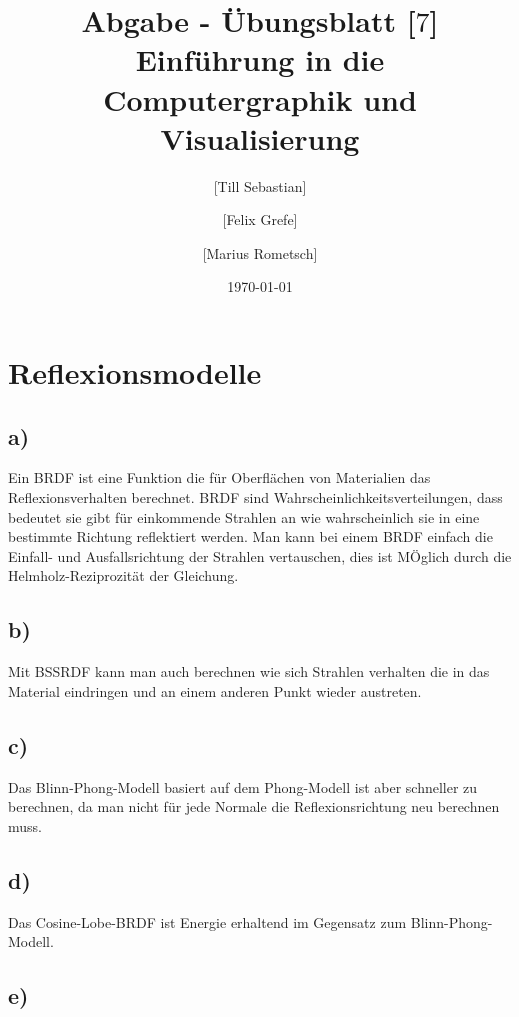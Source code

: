 \documentclass[10pt,a4paper]{article}
\begin{document}
\title{Abgabe - Übungsblatt [$7$]\\
\small{Einführung in die Computergraphik und Visualisierung}}
\author{ [Till Sebastian] \and [Felix Grefe] \and [Marius Rometsch]}
\date{\today}
\maketitle



\section*{Reflexionsmodelle}
\subsection*{a)}
Ein BRDF ist eine Funktion die für Oberflächen von Materialien das Reflexionsverhalten berechnet.
BRDF sind Wahrscheinlichkeitsverteilungen, dass bedeutet sie gibt für einkommende Strahlen an wie wahrscheinlich sie in eine bestimmte Richtung reflektiert werden.
Man kann bei einem BRDF einfach die Einfall- und Ausfallsrichtung der Strahlen vertauschen, dies ist MÖglich durch die Helmholz-Reziprozität der Gleichung.
\subsection*{b)}
Mit BSSRDF kann man auch berechnen wie sich Strahlen verhalten die in das Material eindringen und an einem anderen Punkt wieder austreten.
\subsection*{c)}
Das Blinn-Phong-Modell basiert auf dem Phong-Modell ist aber schneller zu berechnen, da man nicht für jede Normale die Reflexionsrichtung neu berechnen muss.
\subsection*{d)}
Das Cosine-Lobe-BRDF ist Energie erhaltend im Gegensatz zum Blinn-Phong-Modell.
\subsection*{e)}
\end{document}
